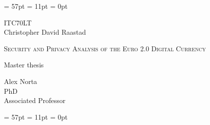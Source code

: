 \documentclass[12pt]{article} %
\begin{document}

\thispagestyle{fancy} %
\renewcommand{\headrulewidth}{0pt} %
\renewcommand{\footrulewidth}{0pt} %
\headheight = 57pt %
\footskip = 11pt %
\headsep = 0pt %

\vspace*{7 cm} %

\begin{center} %
ITC70LT\\[0cm]
Christopher David Raastad\\
\begin{LARGE}
\textsc{Security and Privacy Analysis of the Euro 2.0 Digital Currency\\}
\end{LARGE}
Master thesis\\[2cm]
\end{center}

\begin{flushright} %
Alex Norta\\[0cm]
PhD\\[0cm]
Associated Professor\\[0cm]
\end{flushright}

\pagebreak %

\thispagestyle{fancy} %
\renewcommand{\headrulewidth}{0pt} %
\renewcommand{\footrulewidth}{0pt} %
\headheight = 57pt %
\footskip = 11pt %
\headsep = 0pt %
\end{document}
